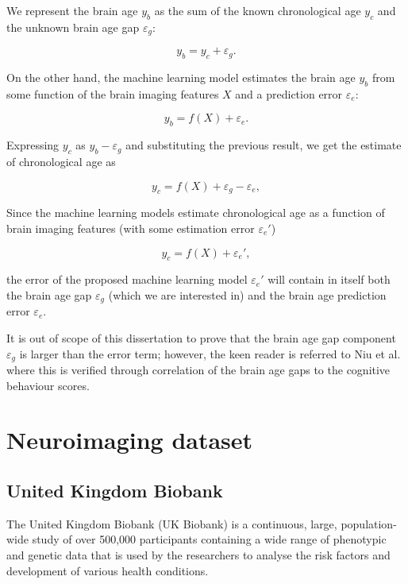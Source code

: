 We represent the brain age $y_b$ as the sum of the known chronological age $y_c$ and the unknown brain age gap $\varepsilon_g$:

\begin{equation}
    y_b = y_c + \varepsilon_g.
\end{equation}

On the other hand, the machine learning model estimates the brain age $y_b$ from some function of the brain imaging features $X$ and a prediction error $\varepsilon_e$:

\begin{equation}
    y_b = f(X) + \varepsilon_e.    
\end{equation}

Expressing $y_c$ as $y_b - \varepsilon_g$ and substituting the previous result, we get the estimate of chronological age as

\begin{equation}
    y_c = f(X) + \varepsilon_g - \varepsilon_e,
\end{equation}

Since the machine learning models estimate chronological age as a function of brain imaging features (with some estimation error $\varepsilon_e'$)

\begin{equation}
    y_c = f(X) + \varepsilon_e',
\end{equation}

the error of the proposed machine learning model $\varepsilon_e'$ will contain in itself both the brain age gap $\varepsilon_g$ (which we are interested in) and the brain age prediction error $\varepsilon_e$.

It is out of scope of this dissertation to prove that the brain age gap component $\varepsilon_g$ is larger than the error term; however, the keen reader is referred to Niu et al. \cite{niu2019improved} where this is verified through correlation of the brain age gaps to the cognitive behaviour scores.

\section{Neuroimaging dataset}
\label{dataset}

\subsection{United Kingdom Biobank}

The United Kingdom Biobank (UK Biobank) \cite{sudlow2015uk} is a continuous, large, population-wide study of over 500,000 participants containing a wide range of phenotypic and genetic data that is used by the researchers to analyse the risk factors and development of various health conditions. 


